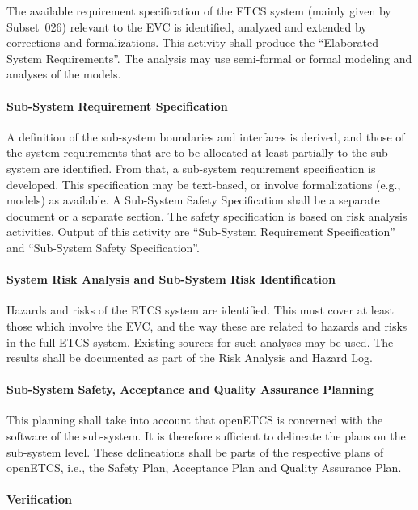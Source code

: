 \documentclass{template/openetcs_article}
\begin{document}
The available requirement specification of the ETCS system (mainly
given by Subset~026) relevant to the EVC is identified, analyzed and
extended by corrections and formalizations. This activity shall
produce the ``Elaborated System Requirements''. The analysis may use
semi-formal or formal modeling and analyses of the models.

\paragraph{Sub-System Requirement Specification}
\label{sec:1-a-2}

A definition of the sub-system boundaries and interfaces is derived,
and those of the system requirements that are to be allocated at least
partially to the sub-system are identified. From that, a sub-system
requirement specification is developed. This specification may be
text-based, or involve formalizations (e.g., models) as available. A
Sub-System Safety Specification shall be a separate document or a
separate section. The safety specification is based on risk analysis
activities. Output of this activity are ``Sub-System Requirement
Specification'' and ``Sub-System Safety Specification''. 

\paragraph{System Risk Analysis and Sub-System Risk Identification}
\label{sec:1-a-3}

Hazards and risks of the ETCS system are identified. This must cover
at least those which involve the EVC, and the way these are related to
hazards and risks in the full ETCS system. Existing sources for such
analyses may be used. The results shall be documented as part of the
Risk Analysis and Hazard Log.

\paragraph{Sub-System Safety, Acceptance and Quality Assurance Planning}
\label{sec:1-a-4}

This planning shall take into account that openETCS is concerned with
the software of the sub-system. It is therefore sufficient to
delineate the plans on the sub-system level. These delineations shall
be parts of the respective plans of openETCS, i.e., the Safety Plan,
Acceptance Plan and Quality Assurance Plan.

\paragraph{Verification}
\end{document}
